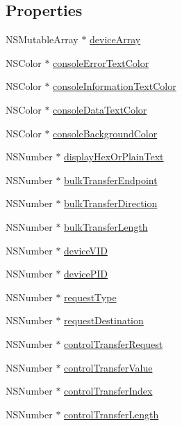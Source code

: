 \subsection*{Properties}
\begin{DoxyCompactItemize}
\item 
N\-S\-Mutable\-Array $\ast$ \hyperlink{interface_c_t_app_delegate_abb817f3911fa838a7715173c81256f00}{device\-Array}
\item 
N\-S\-Color $\ast$ \hyperlink{interface_c_t_app_delegate_ab0bb80237b8aa297ec48dec224eddbb7}{console\-Error\-Text\-Color}
\item 
N\-S\-Color $\ast$ \hyperlink{interface_c_t_app_delegate_a5b184ad30f043f8eb642ef9f21f11555}{console\-Information\-Text\-Color}
\item 
N\-S\-Color $\ast$ \hyperlink{interface_c_t_app_delegate_a51aebba711d81a108659db7f5a2e3509}{console\-Data\-Text\-Color}
\item 
N\-S\-Color $\ast$ \hyperlink{interface_c_t_app_delegate_a9fc48b94e012554988d71fab9fc854b8}{console\-Background\-Color}
\item 
N\-S\-Number $\ast$ \hyperlink{interface_c_t_app_delegate_a4578b9f0c04d7376bde881085bad233a}{display\-Hex\-Or\-Plain\-Text}
\item 
N\-S\-Number $\ast$ \hyperlink{interface_c_t_app_delegate_ae808b0548069c03cc1912db1c83891eb}{bulk\-Transfer\-Endpoint}
\item 
N\-S\-Number $\ast$ \hyperlink{interface_c_t_app_delegate_adea2205a53bdecd999d70b5abd08696f}{bulk\-Transfer\-Direction}
\item 
N\-S\-Number $\ast$ \hyperlink{interface_c_t_app_delegate_ac4efbc9d53180254895b9733fe3d376e}{bulk\-Transfer\-Length}
\item 
N\-S\-Number $\ast$ \hyperlink{interface_c_t_app_delegate_ac3f78415dd122de7cebf7a3745a69da9}{device\-V\-I\-D}
\item 
N\-S\-Number $\ast$ \hyperlink{interface_c_t_app_delegate_a5803369bf1901ee34be36dbdd3eb3734}{device\-P\-I\-D}
\item 
N\-S\-Number $\ast$ \hyperlink{interface_c_t_app_delegate_ae0366c6888903dc8247ecf1f2dacc69d}{request\-Type}
\item 
N\-S\-Number $\ast$ \hyperlink{interface_c_t_app_delegate_a91630675dd1cdd1844fdd217ce52bf86}{request\-Destination}
\item 
N\-S\-Number $\ast$ \hyperlink{interface_c_t_app_delegate_aade0217b509c082080b919e7a9f55046}{control\-Transfer\-Request}
\item 
N\-S\-Number $\ast$ \hyperlink{interface_c_t_app_delegate_a62fe8f350142e22ead502a51f201cb1f}{control\-Transfer\-Value}
\item 
N\-S\-Number $\ast$ \hyperlink{interface_c_t_app_delegate_af08e59f3a506606bfa91e079b9ae16a6}{control\-Transfer\-Index}
\item 
N\-S\-Number $\ast$ \hyperlink{interface_c_t_app_delegate_afb1667e9e2db3e2b289a099508a338d5}{control\-Transfer\-Length}
\end{DoxyCompactItemize}


